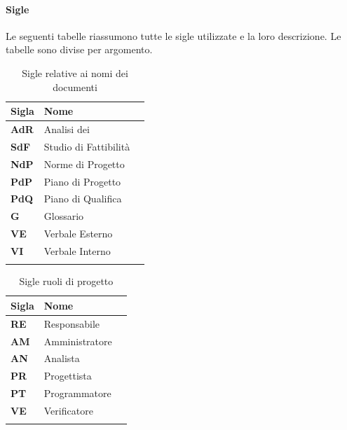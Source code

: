 {{\paragraph*{Sigle}
Le seguenti tabelle riassumono tutte le sigle utilizzate e la loro descrizione. Le tabelle sono divise per argomento.
	\setlength{\freewidth}{\dimexpr\textwidth-1\tabcolsep}
	\renewcommand{\arraystretch}{1.5}
	\setlength{\aboverulesep}{0pt}
	\setlength{\belowrulesep}{0pt}
	\begin{longtable}{L{.1\freewidth} L{.25\freewidth} L{.080\freewidth}}
		\toprule 
		\textbf{Sigla} & \textbf{Nome} \\
		\toprule
		\endhead		
		 \textbf{AdR}& Analisi dei  \\
		 \textbf{SdF} & Studio di Fattibilità \\
		 \textbf{NdP} & Norme di Progetto \\
		 \textbf{PdP} & Piano di Progetto \\
		 \textbf{PdQ} & Piano di Qualifica \\
		 \textbf{G} & Glossario \\
		 \textbf{VE} & Verbale Esterno \\
		 \textbf{VI} & Verbale Interno \\

		\bottomrule
		\hiderowcolors
		\caption{Sigle relative ai nomi dei documenti}
	\end{longtable}
	\setlength{\freewidth}{\dimexpr\textwidth-1\tabcolsep}
	\renewcommand{\arraystretch}{1.5}
	\setlength{\aboverulesep}{0pt}
	\setlength{\belowrulesep}{0pt}
	\begin{longtable}{L{.1\freewidth} L{.25\freewidth} L{.080\freewidth}}
		\toprule 
		\textbf{Sigla} & \textbf{Nome} \\
		\toprule
		\endhead		
		 \textbf{RE}& Responsabile \\
		 \textbf{AM} & Amministratore \\
		 \textbf{AN} & Analista \\
		 \textbf{PR} & Progettista \\
		 \textbf{PT} & Programmatore \\
		 \textbf{VE} & Verificatore \\

		\bottomrule
		\hiderowcolors
		\caption{Sigle ruoli di progetto}
	\end{longtable}
		
}}
